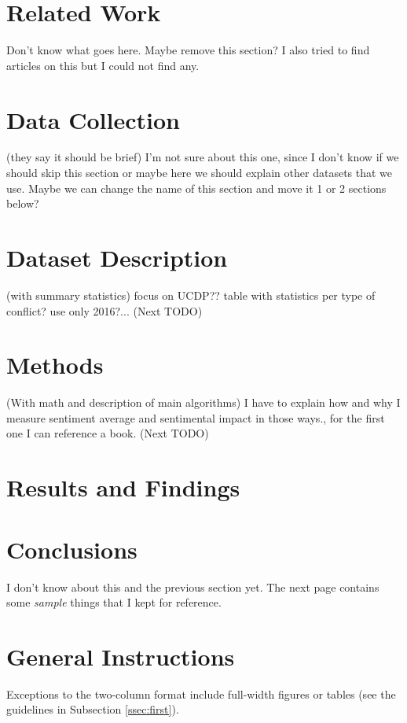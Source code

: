 \documentclass[11pt]{article}
\begin{document}
\section{Related Work}
Don't know what goes here. Maybe remove this section? I also tried to find articles on this but I could not find any.


\section{Data Collection}
(they say it should be brief) I'm not sure about this one, since I don't know if we should skip this section or maybe here we should explain other datasets that we use. Maybe we can change the name of this section and move it 1 or 2 sections below?


\section{Dataset Description}
(with summary statistics) focus on UCDP?? table with statistics per type of conflict? use only 2016?...
(Next TODO)

\section{Methods}
(With math and description of main algorithms)
I have to explain how and why I measure sentiment average and sentimental impact in those ways., for the first one I can reference a book.
(Next TODO)

\section{Results and Findings}

\section{Conclusions}
I don't know about this and the previous section yet.
The next page contains some \emph{sample} things that I kept for reference.

\newpage


\section{General Instructions}
Exceptions to the
two-column format include full-width figures or tables (see the guidelines in
Subsection \ref{ssec:first}).
\end{document}
